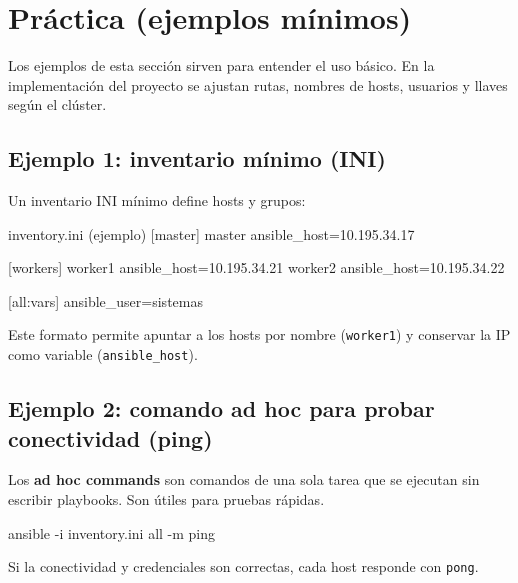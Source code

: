 \section{Práctica (ejemplos mínimos)}
\label{sec:ansible_ejemplos}

Los ejemplos de esta sección sirven para entender el uso básico. En la implementación del proyecto se ajustan rutas, nombres de hosts, usuarios y llaves según el clúster.

\subsection{Ejemplo 1: inventario mínimo (INI)}
\label{subsec:ansible_ej1_inventario}

Un inventario INI mínimo define hosts y grupos:

\begin{iniccode}
inventory.ini (ejemplo)
[master]
master ansible_host=10.195.34.17

[workers]
worker1 ansible_host=10.195.34.21
worker2 ansible_host=10.195.34.22

[all:vars]
ansible_user=sistemas
\end{iniccode}

Este formato permite apuntar a los hosts por nombre (\texttt{worker1}) y conservar la IP como variable (\texttt{ansible\_host}). \cite{ansible_inventory_intro}


\subsection{Ejemplo 2: comando ad hoc para probar conectividad (ping)}
\label{subsec:ansible_ej2_ping}

Los \textbf{ad hoc commands} son comandos de una sola tarea que se ejecutan sin escribir playbooks. Son útiles para pruebas rápidas. \cite{ansible_adhoc_intro}

\begin{bashcode}
ansible -i inventory.ini all -m ping
\end{bashcode}

Si la conectividad y credenciales son correctas, cada host responde con \texttt{pong}.

